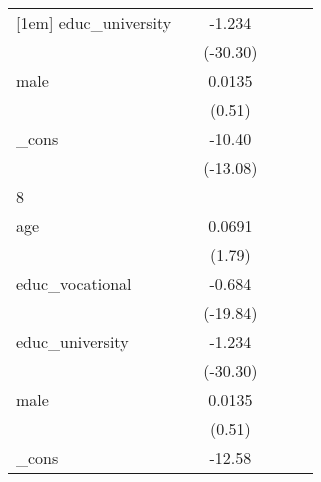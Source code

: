 {\begin{tabular}{l*{5}{c}}
[1em]
educ\_university&                     &      -1.234\sym{***}&                     &                     &                     \\
            &                     &    (-30.30)         &                     &                     &                     \\
[1em]
male        &                     &      0.0135         &                     &                     &                     \\
            &                     &      (0.51)         &                     &                     &                     \\
[1em]
\_cons      &                     &      -10.40\sym{***}&                     &                     &                     \\
            &                     &    (-13.08)         &                     &                     &                     \\
\hline
8           &                     &                     &                     &                     &                     \\
age         &                     &      0.0691         &                     &                     &                     \\
            &                     &      (1.79)         &                     &                     &                     \\
[1em]
educ\_vocational&                     &      -0.684\sym{***}&                     &                     &                     \\
            &                     &    (-19.84)         &                     &                     &                     \\
[1em]
educ\_university&                     &      -1.234\sym{***}&                     &                     &                     \\
            &                     &    (-30.30)         &                     &                     &                     \\
[1em]
male        &                     &      0.0135         &                     &                     &                     \\
            &                     &      (0.51)         &                     &                     &                     \\
[1em]
\_cons      &                     &      -12.58\sym{***}&                     &                     &                     \\

\end{tabular}}
